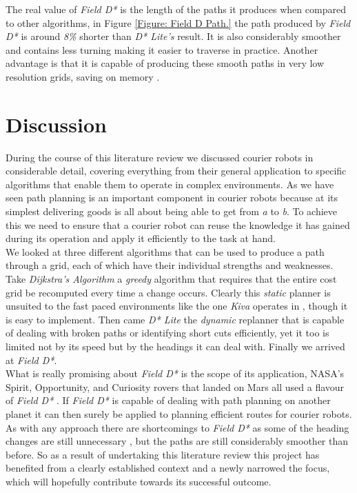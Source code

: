 \noindent
The real value of \textit{Field D*} is the length of the paths it produces when compared to other algorithms, in Figure \ref{Figure: Field D Path.} the path produced by \textit{Field D*} is around \textit{8\%} shorter than \textit{D* Lite's} result. It is also considerably smoother and contains less turning making it easier to traverse in practice. Another advantage is that it is capable of producing these smooth paths in very low resolution grids, saving on memory \cite{FIELD}.


\newpage

\section{Discussion}
During the course of this literature review we discussed courier robots in considerable detail, covering everything from their general application to specific algorithms that enable them to operate in complex environments. As we have seen path planning is an important component in courier robots because at its simplest delivering goods is all about being able to get from \textit{a} to \textit{b}. To achieve this we need to ensure that a courier robot can reuse the knowledge it has gained during its operation and apply it efficiently to the task at hand.\\

\noindent
We looked at three different algorithms that can be used to produce a path through a grid, each of which have their individual strengths and weaknesses. Take \textit{Dijkstra's Algorithm} a \textit{greedy} algorithm that requires that the entire cost grid be recomputed every time a change occurs. Clearly this \textit{static} planner is unsuited to the fast paced environments like the one \textit{Kiva} operates in \cite{AZK12}, though it is easy to implement. Then came \textit{D* Lite} the \textit{dynamic} replanner that is capable of dealing with broken paths or identifying short cuts efficiently, yet it too is limited not by its speed but by the headings it can deal with. Finally we arrived at \textit{Field D*}.\\

\noindent
What is really promising about \textit{Field D*} is the scope of its application, NASA's Spirit, Opportunity, and Curiosity rovers that landed on Mars all used a flavour of \textit{Field D*} \cite{MARS}. If \textit{Field D*} is capable of dealing with path planning on another planet it can then surely be applied to planning efficient routes for courier robots. As with any approach there are shortcomings to \textit{Field D*} as some of the heading changes are still unnecessary \cite{THETA*}, but the paths are still considerably smoother than before. So as a result of undertaking this literature review this project has benefited from a clearly established context and a newly narrowed the focus, which will hopefully contribute towards its successful outcome.


\newpage


